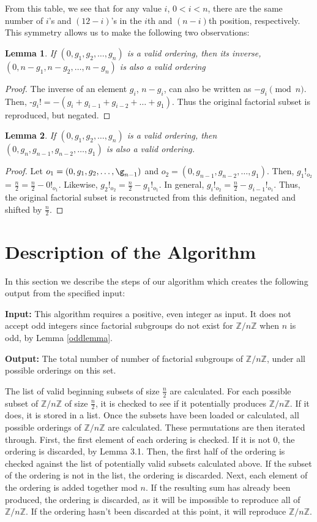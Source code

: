 \documentclass{article}
\newcommand{\ZZ}{\mathbb{Z}}
\newcommand{\ZnZ}{\ZZ/n\ZZ}
\newtheorem{lemma}{Lemma}
\begin{document}
From this table, we see that for any value $i$, $0<i<n$, there are the same number of $i$'s and $(12-i)$'s in the $i$th and $(n-i)$th position, respectively. This symmetry allows us to make the following two observations:
\begin{lemma}
If $(0,g_1,g_2,\ldots,g_n)$ is a valid ordering, then its inverse, $(0, n-g_1, n-g_2, \ldots, n-g_n)$ is also a valid ordering
\end{lemma}
\begin{proof}
The inverse of an element $g_i$, $n-g_i$, can also be written as $-g_i\pmod{n}$. Then, -$g_i! = -(g_i + g_{i-1} + g_{i-2} + \ldots + g_1)$. Thus the original factorial subset is reproduced, but negated. 
\end{proof}
\begin{lemma}
If $(0, g_1, g_2, \ldots, g_n)$ is a valid ordering, then $(0, g_n, g_{n-1}, g_{n-2}, \ldots, g_1)$ is also a valid ordering.
\end{lemma}
\begin{proof}
Let $o_1 = (0,g_1, g_2, \ldots, \g_{n-1})$ and $o_2 = (0, g_{n-1}, g_{n-2}, \ldots, g_1)$. Then, $g_1!_{o_2}$ = $\frac{n}{2} = \frac{n}{2} - 0!_{o_1}$. Likewise, $g_2!_{o_2} = \frac{n}{2}-g_1!_{o_1}$. In general, $g_i!_{o_2} = \frac{n}{2} - g_{i-1}!_{o_1}$. Thus, the original factorial subset is reconstructed from this definition, negated and shifted by $\frac{n}{2}$.  
\end{proof}

\section{Description of the Algorithm}

In this section we describe the steps of our algorithm which creates the following output from the specified input:

\noindent\textbf{Input:} This algorithm requires a positive, even integer as input. It does not accept odd integers since factorial subgroups do not exist for $\ZnZ$ when $n$ is odd, by Lemma \ref{oddlemma}.

\noindent\textbf{Output:} The total number of number of factorial subgroups of $\ZnZ$, under all possible orderings on this set.

The list of valid beginning subsets of size $\frac{n}{2}$ are calculated. For each possible subset of $\ZnZ$ of size $\frac{n}{2}$, it is checked to see if it potentially produces $\ZnZ$. If it does, it is stored in a list. Once the subsets have been loaded or calculated, all possible orderings of $\ZnZ$ are calculated. These permutations are then iterated through. First, the first element of each ordering is checked. If it is not 0, the ordering is discarded, by Lemma 3.1. Then, the first half of the ordering is checked against the list of potentially valid subsets calculated above. If the subset of the ordering is not in the list, the ordering is discarded. Next, each element of the ordering is added together mod $n$. If the resulting sum has already been produced, the ordering is discarded, as it will be impossible to reproduce all of $\ZnZ$. If the ordering hasn't been discarded at this point, it will reproduce $\ZnZ$.
\end{document}
